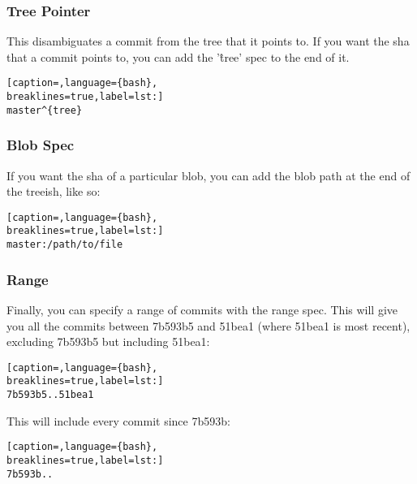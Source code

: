 \subsubsection{Tree Pointer}
This disambiguates a commit from the tree that it points to. If you want the
sha that a commit points to, you can add the '\^{tree}' spec to the end of it.
\lstset{basicstyle=\scriptsize, numbers=none, captionpos=b, tabsize=4}
\begin{lstlisting}[caption=,language={bash},
breaklines=true,label=lst:]
master^{tree}
\end{lstlisting}

\subsubsection{Blob Spec}
If you want the sha of a particular blob, you can add the blob path at the end
of the treeish, like so:
\lstset{basicstyle=\scriptsize, numbers=none, captionpos=b, tabsize=4}
\begin{lstlisting}[caption=,language={bash},
breaklines=true,label=lst:]
master:/path/to/file
\end{lstlisting}

\subsubsection{Range}
Finally, you can specify a range of commits with the range spec. This will give
you all the commits between 7b593b5 and 51bea1 (where 51bea1 is most recent),
excluding 7b593b5 but including 51bea1:
\lstset{basicstyle=\scriptsize, numbers=none, captionpos=b, tabsize=4}
\begin{lstlisting}[caption=,language={bash},
breaklines=true,label=lst:]
7b593b5..51bea1
\end{lstlisting}

This will include every commit since 7b593b:
\lstset{basicstyle=\scriptsize, numbers=none, captionpos=b, tabsize=4}
\begin{lstlisting}[caption=,language={bash},
breaklines=true,label=lst:]
7b593b.. 
\end{lstlisting}
